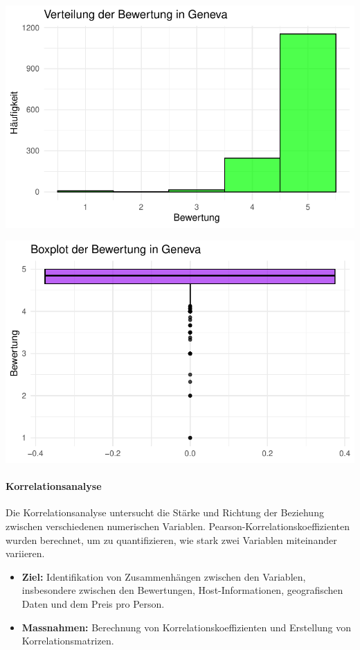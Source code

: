 \documentclass[
  journal,
]{IEEEtran}%
\let\oldparagraph\paragraph
\renewcommand{\paragraph}[1]{\oldparagraph{#1}\mbox{}}
\begin{document}
\includegraphics{main_files/figure-pdf/descriptive geneva-3.pdf}

\includegraphics{main_files/figure-pdf/descriptive geneva-4.pdf}

\hypertarget{korrelationsanalyse}{%
\paragraph{\texorpdfstring{\textbf{Korrelationsanalyse}}{Korrelationsanalyse}}\label{korrelationsanalyse}}

Die Korrelationsanalyse untersucht die Stärke und Richtung der Beziehung
zwischen verschiedenen numerischen Variablen.
Pearson-Korrelationskoeffizienten wurden berechnet, um zu
quantifizieren, wie stark zwei Variablen miteinander variieren.

\begin{itemize}
\item
  \textbf{Ziel:} Identifikation von Zusammenhängen zwischen den
  Variablen, insbesondere zwischen den Bewertungen, Host-Informationen,
  geografischen Daten und dem Preis pro Person.
\item
  \textbf{Massnahmen:} Berechnung von Korrelationskoeffizienten und
  Erstellung von Korrelationsmatrizen.
\end{itemize}
\end{document}
